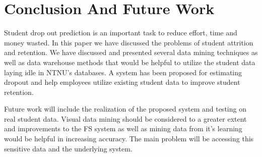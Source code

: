 \chapter{Conclusion And Future Work}
Student drop out prediction is an important task to reduce effort, time and money wasted.
In this paper we have discussed the problems of student attrition and retention.
We have discussed and presented several data mining techniques as well as data warehouse methods that would be helpful to utilize the student data laying idle in NTNU's databases.
A system has been proposed for estimating dropout and help employees utilize existing student data to improve student retention.

\bigskip\noindent
Future work will include the realization of the proposed system and testing on real student data.
Visual data mining should be considered to a greater extent and improvements to the FS system as well as mining data from it's learning would be helpful in increasing accuracy.
The main problem will be accessing this sensitive data and the underlying system.
